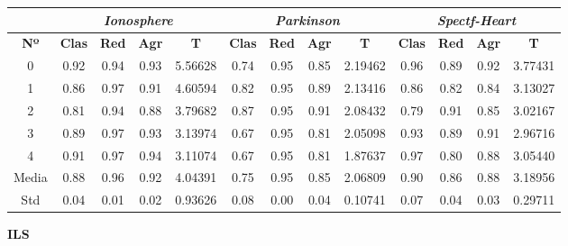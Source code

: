 \documentclass[10pt, a4paper]{article}
\theoremstyle{theorem-style}
\theoremstyle{theorem-style}
\theoremstyle{theorem2-style}
\theoremstyle{definition-style}
\theoremstyle{remark-style}
\theoremstyle{example-style}
\theoremstyle{definition-style}
\theoremstyle{remark-style}
\theoremstyle{remark-style}
\begin{document}
\begin{table}[ht!]
\begin{tabular}{ccccc|cccc|cccc}
\centering
 & \multicolumn{4}{c}{\textit{Ionosphere}} & \multicolumn{4}{c}{\textit{Parkinson}} & \multicolumn{4}{c}{\textit{Spectf-Heart}} \\ \hline
\textbf{Nº} & \textbf{Clas} & \textbf{Red} & \textbf{Agr} & \textbf{T} & \textbf{Clas} & \textbf{Red} & \textbf{Agr} & \textbf{T} & \textbf{Clas} & \textbf{Red} & \textbf{Agr} & \textbf{T} \\ \hline
0&	 0.92 & 0.94 & 0.93 & 5.56628 & 	0.74 & 0.95 & 0.85 & 2.19462 & 0.96 & 0.89 & 0.92 & 3.77431 \\ 
1&	 0.86 & 0.97 & 0.91 & 4.60594 & 	0.82 & 0.95 & 0.89 & 2.13416 & 0.86 & 0.82 & 0.84 & 3.13027 \\ 
2&	 0.81 & 0.94 & 0.88 & 3.79682 & 	0.87 & 0.95 & 0.91 & 2.08432 & 0.79 & 0.91 & 0.85 & 3.02167 \\ 
3&	 0.89 & 0.97 & 0.93 & 3.13974 & 	0.67 & 0.95 & 0.81 & 2.05098 & 0.93 & 0.89 & 0.91 & 2.96716 \\ 
4&	 0.91 & 0.97 & 0.94 & 3.11074 & 	0.67 & 0.95 & 0.81 & 1.87637 & 0.97 & 0.80 & 0.88 & 3.05440 \\
\hline 
Media&	 0.88 & 0.96 & 0.92 & 4.04391	& 0.75 & 0.95 & 0.85 & 2.06809	&	0.90 & 0.86 & 0.88 & 3.18956
 \\ Std&	 0.04 & 0.01 & 0.02 & 0.93626&	0.08 & 0.00 & 0.04 & 0.10741	&	0.07 & 0.04 & 0.03 & 0.29711
 \\
\end{tabular}
\end{table}

\textbf{ILS}
\end{document}
